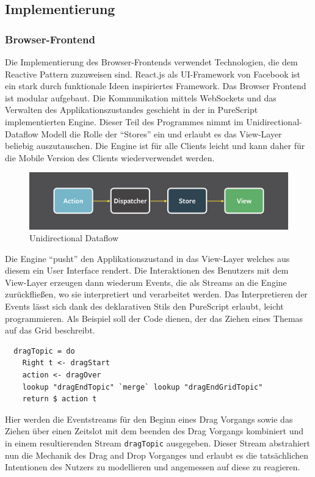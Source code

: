 \subsection{Implementierung}
\subsubsection{Browser-Frontend}
Die Implementierung des Browser-Frontends verwendet Technologien, die dem Reactive Pattern zuzuweisen sind.
React.js als UI-Framework von Facebook ist ein stark durch funktionale
Ideen inspiriertes Framework. Das Browser Frontend ist modular
aufgebaut. Die Kommunikation mittels WebSockets und das Verwalten des
Applikationszustandes geschieht in der in PureScript implementierten
Engine. Dieser Teil des Programmes  nimmt im Unidirectional-Dataflow
Modell die Rolle der ``Stores'' ein und erlaubt es das View-Layer
beliebig auszutauschen. Die Engine ist für alle Clients leicht und
kann daher für die Mobile Version des Clients wiederverwendet werden.
\begin{figure}[h]
\includegraphics[scale=0.3]{img/Unidirectional.png}
\caption{Unidirectional Dataflow}
\end{figure}

\noindent Die Engine ``pusht'' den Applikationszustand in das
View-Layer welches aus diesem ein User Interface rendert.
Die Interaktionen des Benutzers mit dem View-Layer erzeugen dann
wiederum Events, die als Streams an die Engine zurückfließen, wo sie
interpretiert und verarbeitet werden. Das Interpretieren der Events
lässt sich dank des deklarativen Stils den PureScript erlaubt, leicht
programmieren. Als Beispiel soll der Code dienen, der das Ziehen eines
Themas auf das Grid beschreibt.

\begin{lstlisting}
  dragTopic = do
    Right t <- dragStart
    action <- dragOver
    lookup "dragEndTopic" `merge` lookup "dragEndGridTopic"
    return $ action t
\end{lstlisting}
\noindent Hier werden die Eventstreams für den Beginn eines
Drag Vorgangs sowie das Ziehen über einen Zeitslot mit dem beenden des
Drag Vorgangs kombiniert und in einem resultierenden Stream \texttt{dragTopic}
ausgegeben. Dieser Stream abstrahiert nun die Mechanik des Drag and
Drop Vorganges und erlaubt es die tatsächlichen Intentionen des
Nutzers zu modellieren und angemessen auf diese zu reagieren.
